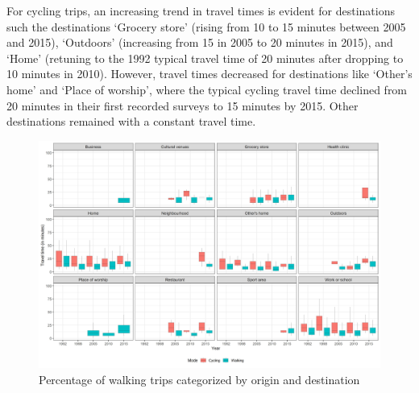 \documentclass[preprint, 3p,
authoryear]{elsarticle} %
\begin{document}
For cycling trips, an increasing trend in travel times is evident for
destinations such the destinations `Grocery store' (rising from 10 to 15
minutes between 2005 and 2015), `Outdoors' (increasing from 15 in 2005
to 20 minutes in 2015), and `Home' (retuning to the 1992 typical travel
time of 20 minutes after dropping to 10 minutes in 2010). However,
travel times decreased for destinations like `Other's home' and `Place
of worship', where the typical cycling travel time declined from 20
minutes in their first recorded surveys to 15 minutes by 2015. Other
destinations remained with a constant travel time.

\begin{figure}
\includegraphics[width=1\linewidth]{figures/destination_boxplots} \caption{Percentage of walking trips categorized by origin and destination}\label{fig:figure-boxplot}
\end{figure}
\end{document}
